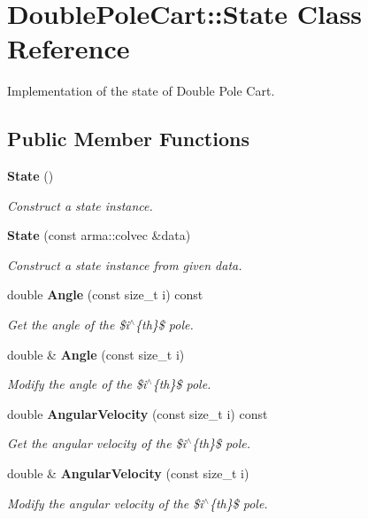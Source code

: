 \section{Double\+Pole\+Cart\+:\+:State Class Reference}
\label{classmlpack_1_1rl_1_1DoublePoleCart_1_1State}


Implementation of the state of Double Pole Cart.  


\subsection*{Public Member Functions}
\begin{DoxyCompactItemize}
\item 
\textbf{ State} ()
\begin{DoxyCompactList}\small\item\em Construct a state instance. \end{DoxyCompactList}\item 
\textbf{ State} (const arma\+::colvec \&data)
\begin{DoxyCompactList}\small\item\em Construct a state instance from given data. \end{DoxyCompactList}\item 
double \textbf{ Angle} (const size\+\_\+t i) const
\begin{DoxyCompactList}\small\item\em Get the angle of the \$i$^\wedge$\{th\}\$ pole. \end{DoxyCompactList}\item 
double \& \textbf{ Angle} (const size\+\_\+t i)
\begin{DoxyCompactList}\small\item\em Modify the angle of the \$i$^\wedge$\{th\}\$ pole. \end{DoxyCompactList}\item 
double \textbf{ Angular\+Velocity} (const size\+\_\+t i) const
\begin{DoxyCompactList}\small\item\em Get the angular velocity of the \$i$^\wedge$\{th\}\$ pole. \end{DoxyCompactList}\item 
double \& \textbf{ Angular\+Velocity} (const size\+\_\+t i)
\begin{DoxyCompactList}\small\item\em Modify the angular velocity of the \$i$^\wedge$\{th\}\$ pole. \end{DoxyCompactList}\item 

\end{DoxyCompactItemize}
